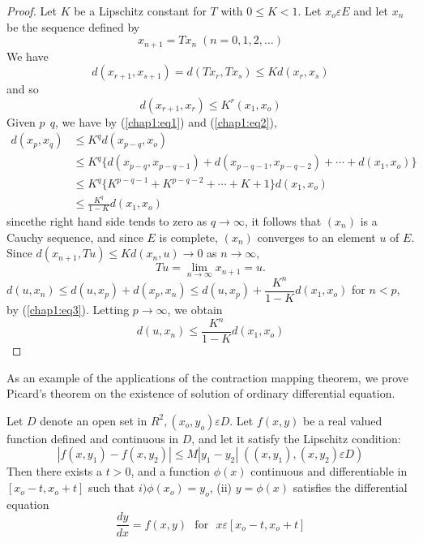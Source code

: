 \begin{proof}
  Let $K$ be a Lipschitz constant for $T$ with $0 \leq K < 1$. Let
  $x_o \varepsilon E$ and let $x_n$ be the sequence defined by 
  $$
  x_{n+1} = Tx_n \; (n=0 , 1,2,\ldots)
  $$
  We have 
  \begin{equation*}
    d(x_{r+1}, x_{s+1}) = d(Tx_r , Tx_s) \leq Kd (x_r, x_s)
    \tag{1}\label{chap1:eq1} 
  \end{equation*} 
  and so
  \begin{equation*}
    d(x_{r+1} , x_r) \leq K^r (x_1, x_o) \tag{2}\label{chap1:eq2}
  \end{equation*} 
  Given $p ~~q$, we have by (\ref{chap1:eq1}) and (\ref{chap1:eq2}),
  \begin{align*}
    d(x_p , x_q ) & \leq K^q d (x_{p-q}, x_o)\\
    &\leq K^q \bigg \{ d (x_{p-q}, x_{p-q-1}) + d(x_{p-q-1},x_{p-q-2}
    ) + \cdots + d(x_1, x_o)\bigg \}\\ 
    & \leq K^q \bigg \{ K^{p-q-1} + K^{p-q-2} + \cdots + K +  1 \bigg
    \} d(x_1, x_o)\\ 
    & \leq \frac{K^q}{1-K} d (x_1, x_o) \tag{3}\label{chap1:eq3} 
  \end{align*} 
  since\pageoriginale the right hand side tends to zero as $q \to \infty$, it
  follows that $(x_n)$ is a Cauchy sequence, and since $E$ is
  complete, $(x_n)$ converges to an element $u$ of $E$. Since
  $d(x_{n+1}, Tu) \leq K d(x_n , u) \to 0 $ as $n \to \infty$, 
  $$
  Tu = \lim_{n \to \infty} x_{n+1} = u.
  $$
  $d(u,x_n ) \leq d (u, x_p) + d(x_p, x_n) \leq d(u,x_p) +
  \dfrac{K^n}{1-K} d(x_1, x_o)$ for $n< p$, by
  (\ref{chap1:eq3}). Letting $p \to 
  \infty$, we obtain   
  $$
  d(u, x_n) \leq \frac{K^n}{1-K} d (x_1, x_o)
  $$
\end{proof}

\begin{example*}%
  As an example of the applications of the contraction mapping
  theorem, we prove Picard's theorem on the existence of solution of
  ordinary differential equation. 
\end{example*}

Let $D$ denote an open set in $R^2, (x_o, y_o) \varepsilon D$. Let $f(x,y)$ be
a real valued function defined and continuous in $D$, and let it
satisfy  the Lipschitz condition: 
$$
|f(x,y_1) - f (x, y_2)| \leq M |y_1 - y_2| \; ((x,y_1), (x, y_2) \varepsilon D) 
$$
Then there exists a $t > 0$, and a function $\phi (x)$ continuous and
differentiable in $[x_o - t, x_o + t]$ such that $i) \phi (x_o) = y_o$,
(ii) $y = \phi (x)$ satisfies the differential equation  
$$
\frac{dy}{dx} = f (x,y) \text{~ for~ } x \varepsilon [x_o - t, x_o +t]
$$

